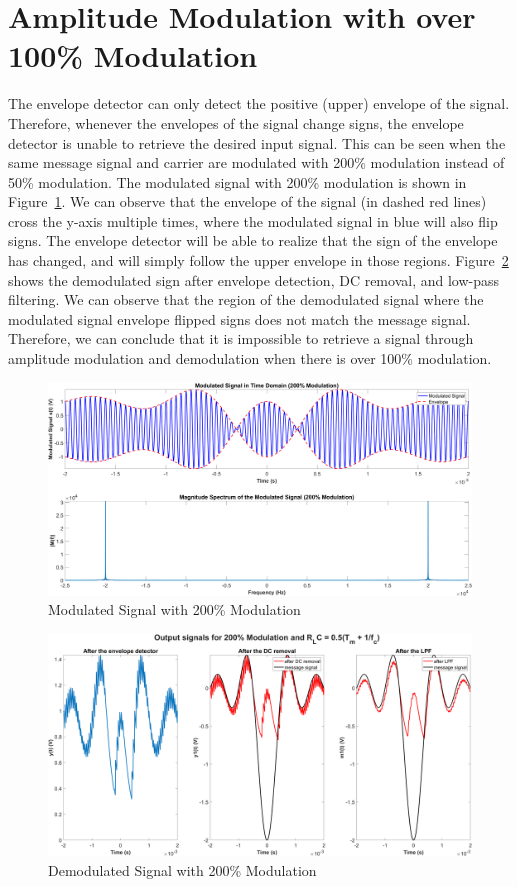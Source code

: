 \documentclass[12pt]{article}
\begin{document}
\section*{Amplitude Modulation with over 100\% Modulation}
The envelope detector can only detect the positive (upper) envelope of the signal. Therefore, whenever the envelopes of the signal change signs, the envelope detector is unable to retrieve the desired input signal. This can be seen when the same message signal and carrier are modulated with 200\% modulation instead of 50\% modulation. The modulated signal with 200\% modulation is shown in Figure~\ref{fig:q3_mod}. We can observe that the envelope of the signal (in dashed red lines) cross the y-axis multiple times, where the modulated signal in blue will also flip signs. The envelope detector will be able to realize that the sign of the envelope has changed, and will simply follow the upper envelope in those regions. Figure~\ref{fig:q3_demod} shows the demodulated sign after envelope detection, DC removal, and low-pass filtering. We can observe that the region of the demodulated signal where the modulated signal envelope flipped signs does not match the message signal. Therefore, we can conclude that it is impossible to retrieve a signal through amplitude modulation and demodulation when there is over 100\% modulation.
\begin{figure}[h!]
    \centering
    \includegraphics[width=\textwidth]{q3_mod}
    \caption{\label{fig:q3_mod}Modulated Signal with 200\% Modulation}
\end{figure}
\begin{figure}[h!]
    \centering
    \includegraphics[width=\textwidth]{q3_demod}
    \caption{\label{fig:q3_demod}Demodulated Signal with 200\% Modulation}
\end{figure}
\end{document}
